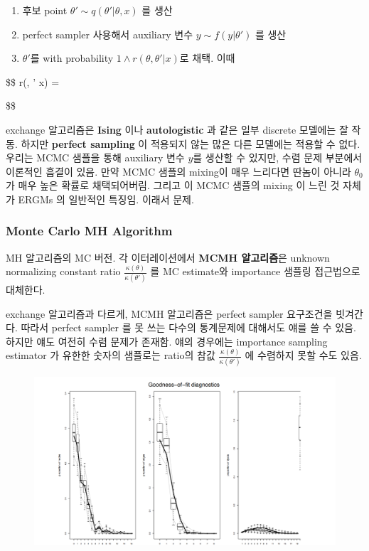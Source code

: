 \documentclass[
]{book}
\providecommand{\tightlist}{%
  \setlength{\itemsep}{0pt}\setlength{\parskip}{0pt}}
\begin{document}
{{{\begin{enumerate}
\def\labelenumi{\arabic{enumi}.}
\tightlist
\item
  후보 point \(\theta ' \sim q(\theta ' | \theta, x)\) 를 생산
\item
  perfect sampler 사용해서 auxiliary 변수 \(y \sim f(y | \theta ')\) 를 생산
\item
  \(\theta'\)를 with probability \(1 \wedge r(\theta, \theta ' \Big | x)\)로 채택. 이때
\end{enumerate}

\$\$
r(\theta, \theta ' \Big \textbar{} x) =

\cdot
{}
\cdot
{}
\cdot
{}

\$\$

exchange 알고리즘은 \textbf{Ising} 이나 \textbf{autologistic} 과 같은 일부 discrete 모델에는 잘 작동. 하지만 \textbf{perfect sampling} 이 적용되지 않는 많은 다른 모델에는 적용할 수 없다. 우리는 MCMC 샘플을 통해 auxiliary 변수 \(y\)를 생산할 수 있지만, 수렴 문제 부분에서 이론적인 흠결이 있음. 만약 MCMC 샘플의 mixing이 매우 느리다면 딴놈이 아니라 \(\theta_0\) 가 매우 높은 확률로 채택되어버림. 그리고 이 MCMC 샘플의 mixing 이 느린 것 자체가 ERGMs 의 일반적인 특징임. 이래서 문제.

\hypertarget{monte-carlo-mh-algorithm}{%
\subsubsection{Monte Carlo MH Algorithm}\label{monte-carlo-mh-algorithm}}

MH 알고리즘의 MC 버전. 각 이터레이션에서 \textbf{MCMH 알고리즘}은 unknown normalizing constant ratio \(\frac{\kappa(\theta)}{\kappa(\theta')}\) 를 MC estimate와 importance 샘플링 접근법으로 대체한다.

exchange 알고리즘과 다르게, MCMH 알고리즘은 perfect sampler 요구조건을 빗겨간다. 따라서 perfect sampler 를 못 쓰는 다수의 통계문제에 대해서도 얘를 쓸 수 있음. 하지만 얘도 여전히 수렴 문제가 존재함. 얘의 경우에는 importance sampling estimator 가 유한한 숫자의 샘플로는 ratio의 참값 \(\frac{\kappa(\theta)}{\kappa(\theta')}\) 에 수렴하지 못할 수도 있음.

\begin{figure}

{\centering \includegraphics[width=26.08in]{pics/network/06/01} 

}
\end{figure}}}}
\end{document}
